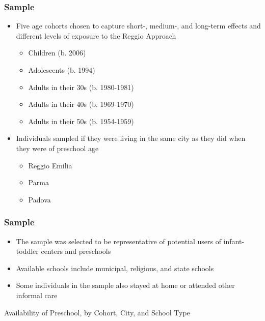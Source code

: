 \documentclass[static]{JJH-Beamer_PAGENOS}
\begin{document}
\begin{frame}
\frametitle{Sample}
\begin{itemize}
	\item Five age cohorts chosen to capture short-, medium-, and long-term effects and different levels of exposure to the Reggio Approach
	\begin{itemize}
		\item Children (b. 2006)
		\item Adolescents (b. 1994)
		\item Adults in their 30s (b. 1980-1981)
		\item Adults in their 40s (b. 1969-1970)
		\item Adults in their 50s (b. 1954-1959)
	\end{itemize}
	\item Individuals sampled if they were living in the same city as they did when they were of preschool age
		\begin{itemize}
			\item Reggio Emilia
			\item Parma
			\item Padova
		\end{itemize}
\end{itemize}
\end{frame}


\begin{frame}
\frametitle{Sample}
\begin{itemize}
	\item The sample was selected to be representative of potential users of infant-toddler centers and preschools
	\item Available schools include municipal, religious, and state schools
	\item Some individuals in the sample also stayed at home or attended other informal care
\end{itemize}
\begin{table}[H]
\caption{Availability of Preschool, by Cohort, City, and School Type}
\end{table}
\end{frame}

\end{document}
